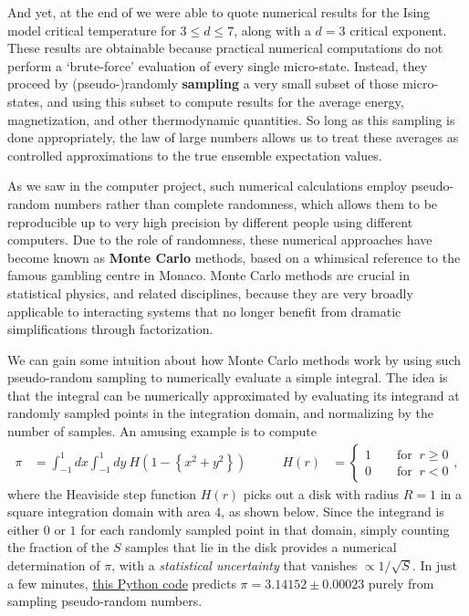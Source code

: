 And yet, at the end of  we were able to quote numerical results for the Ising model critical temperature for $3 \leq d \leq 7$, along with a $d = 3$ critical exponent.
These results are obtainable because practical numerical computations do not perform a `brute-force' evaluation of every single micro-state.
Instead, they proceed by (pseudo-)randomly \textbf{sampling} a very small subset of those micro-states, and using this subset to compute results for the average energy, magnetization, and other thermodynamic quantities.
So long as this sampling is done appropriately, the law of large numbers allows us to treat these averages as controlled approximations to the true ensemble expectation values.

As we saw in the computer project, such numerical calculations employ pseudo-random numbers rather than complete randomness, which allows them to be reproducible up to very high precision by different people using different computers.
Due to the role of randomness, these numerical approaches have become known as \textbf{Monte Carlo} methods, based on a whimsical reference to the famous gambling centre in Monaco.
Monte Carlo methods are crucial in statistical physics, and related disciplines, because they are very broadly applicable to interacting systems that no longer benefit from dramatic simplifications through factorization.

We can gain some intuition about how Monte Carlo methods work by using such pseudo-random sampling to numerically evaluate a simple integral.
The idea is that the integral can be numerically approximated by evaluating its integrand at randomly sampled points in the integration domain, and normalizing by the number of samples.
An amusing example is to compute
\begin{align*}
  \pi & = \int_{-1}^1 dx \int_{-1}^1 dy \ H\!\left(1 - \left\{x^2 + y^2\right\}\right) \qquad &
  H(r) & = \left\{\begin{array}{l}1 \qquad \mbox{for } \ r \geq 0 \\
                                  0 \qquad \mbox{for } \ r < 0\end{array}\right. ,
\end{align*}
where the Heaviside step function $H(r)$ picks out a disk with radius $R = 1$ in a square integration domain with area $4$, as shown below.
Since the integrand is either $0$ or $1$ for each randomly sampled point in that domain, simply counting the fraction of the $S$ samples that lie in the disk provides a numerical determination of $\pi$, with a \textit{statistical uncertainty} that vanishes $\propto 1 / \sqrt{S}$.
In just a few minutes, \href{https://github.com/daschaich/MATH327_2023/blob/main/lecture_notes/unit10_pi.py}{this Python code} predicts $\pi = 3.14152 \pm 0.00023$ purely from sampling pseudo-random numbers.

